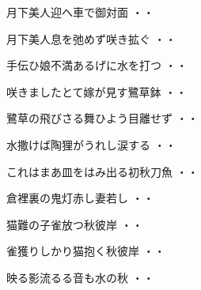 \vspace{0.6cm}
\begin{shiika}月下美人迎へ車で御対面
\hfill{・・}\end{shiika}
\vspace{0.6cm}
\begin{shiika}月下美人息を弛めず咲き拡ぐ
\hfill{・・}\end{shiika}
\vspace{0.6cm}
\begin{shiika}手伝ひ娘不満あるげに水を打つ
\hfill{・・}\end{shiika}
\vspace{0.6cm}
\begin{shiika}咲きましたとて嫁が見す鷺草鉢
\hfill{・・}\end{shiika}
\vspace{0.6cm}
\begin{shiika}鷺草の飛びさる舞ひよう目離せず
\hfill{・・}\end{shiika}
\vspace{0.6cm}
\begin{shiika}水撒けば陶狸がうれし涙する
\hfill{・・}\end{shiika}
\vspace{0.6cm}
\begin{shiika}これはまあ皿をはみ出る初秋刀魚
\hfill{・・}\end{shiika}
\vspace{0.6cm}
\begin{shiika}倉裡裏の鬼灯赤し妻若し
\hfill{・・}\end{shiika}
\vspace{0.6cm}
\begin{shiika}猫難の子雀放つ秋彼岸
\hfill{・・}\end{shiika}
\vspace{0.6cm}
\begin{shiika}雀獲りしかり猫抱く秋彼岸
\hfill{・・}\end{shiika}
\vspace{0.6cm}
\begin{shiika}映る影流るる音も水の秋
\hfill{・・}\end{shiika}
\vspace{0.6cm}

